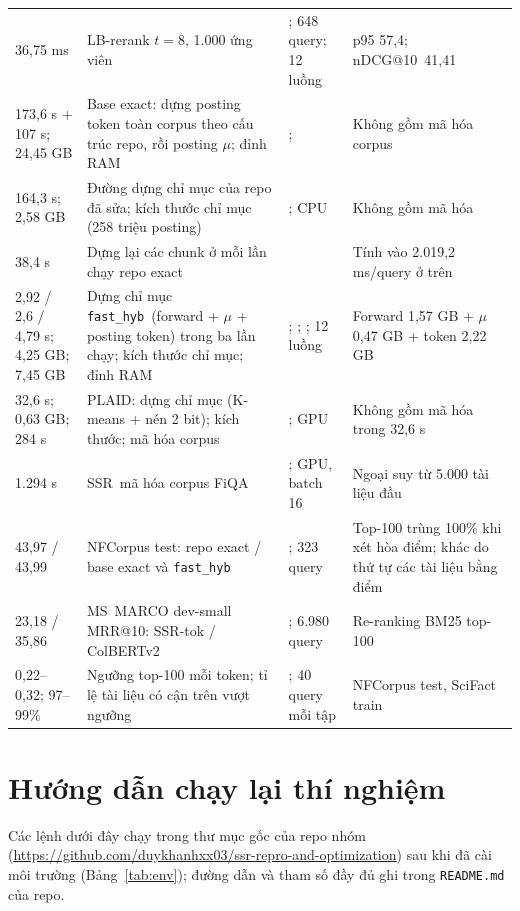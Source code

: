 \documentclass[a4paper,13pt]{extreport}
\makeatletter
\newcommand{\RepoNhom}{https://github.com/duykhanhxx03/ssr-repro-and-optimization}
\theoremstyle{plain}
\newcommand{\ssr}{SSR}
\newcommand{\ndcg}{nDCG@10}
\newcommand{\mrr}{MRR@10}
\newcommand{\fasthyb}{\texttt{fast\_hyb}}
\makeatother
\begin{document}
\begin{footnotesize}
\begin{longtable}{P{2.3cm}P{3.6cm}P{3.9cm}P{3.8cm}}
36,75 ms & LB-rerank $t=8$, 1.000 ứng viên & ; 648 query; 12 luồng & p95 57,4; \ndcg\ 41,41\\
173,6 s + 107 s; 24,45 GB & Base exact: dựng posting token toàn corpus theo cấu trúc repo, rồi posting $\mu$; đỉnh RAM & ;  & Không gồm mã hóa corpus\\
164,3 s; 2,58 GB & Đường dựng chỉ mục của repo đã sửa; kích thước chỉ mục (258 triệu posting) & ; CPU & Không gồm mã hóa\\
38,4 s & Dựng lại các chunk ở mỗi lần chạy repo exact &  & Tính vào 2.019,2 ms/query ở trên\\
2,92 / 2,6 / 4,79 s; 4,25 GB; 7,45 GB & Dựng chỉ mục \fasthyb\ (forward + $\mu$ + posting token) trong ba lần chạy; kích thước chỉ mục; đỉnh RAM & ; ; ; 12 luồng & Forward 1,57 GB + $\mu$ 0,47 GB + token 2,22 GB\\
32,6 s; 0,63 GB; 284 s & PLAID: dựng chỉ mục (K-means + nén 2 bit); kích thước; mã hóa corpus & ; GPU & Không gồm mã hóa trong 32,6 s\\
1.294 s & \ssr\ mã hóa corpus FiQA & ; GPU, batch 16 & Ngoại suy từ 5.000 tài liệu đầu\\
43,97 / 43,99 & NFCorpus test: repo exact / base exact và \fasthyb & ; 323 query & Top-100 trùng 100\% khi xét hòa điểm; khác do thứ tự các tài liệu bằng điểm\\
23,18 / 35,86 & MS~MARCO dev-small \mrr: \ssr-tok / ColBERTv2 & ; 6.980 query & Re-ranking BM25 top-100\\
0,22--0,32; 97--99\% & Ngưỡng top-100 mỗi token; tỉ lệ tài liệu có cận trên vượt ngưỡng & ; 40 query mỗi tập & NFCorpus test, SciFact train\\
\end{longtable}
\end{footnotesize}

\chapter{Hướng dẫn chạy lại thí nghiệm}
\label{app:run}
Các lệnh dưới đây chạy trong thư mục gốc của repo nhóm (\url{\RepoNhom}) sau khi đã cài môi trường (Bảng~\ref{tab:env}); đường dẫn và tham số đầy đủ ghi trong \texttt{README.md} của repo.
\end{document}
